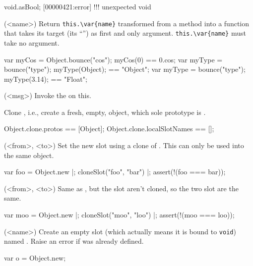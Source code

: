 \begin{urbiscriptapi}
\begin{urbiscript}
void.asBool;
[00000421:error] !!! unexpected void
\end{urbiscript}

\item[bounce](<name>)%
  Return \lstinline|this.\var{name}| transformed from a method into a
  function that takes its target (its ``\this'') as first
  and only argument.  \lstinline|this.\var{name}| must take no
  argument.
\begin{urbiassert}
{ var myCos = Object.bounce("cos"); myCos(0) }   == 0.cos;
{ var myType = bounce("type"); myType(Object); } == "Object";
{ var myType = bounce("type"); myType(3.14); }   == "Float";
\end{urbiassert}

\item[callMessage](<msg>)%
  Invoke the   on this.
\item[clone]
  Clone \this, i.e., create a fresh, empty, object, which
  sole prototype is \this.
\begin{urbiassert}
Object.clone.protos == [Object];
Object.clone.localSlotNames == [];
\end{urbiassert}

\item[cloneSlot](<from>, <to>)%
  Set the new slot  using a clone of . This can only
  be used into the same object.
\begin{urbiscript}
var foo = Object.new |;
cloneSlot("foo", "bar") |;
assert(!(foo === bar));
\end{urbiscript}

\item[copySlot](<from>, <to>)%
  Same as , but the slot aren't cloned, so the two slot
  are the same.
\begin{urbiscript}
var moo = Object.new |;
cloneSlot("moo", "loo") |;
assert(!(moo === loo));
\end{urbiscript}

\item[createSlot](<name>)%
  Create an empty slot (which actually means it is bound to
  \lstinline|void|) named .  Raise an error if 
  was already defined.
\begin{urbiassert}
var o = Object.new;


\end{urbiassert}
\end{urbiscriptapi}
